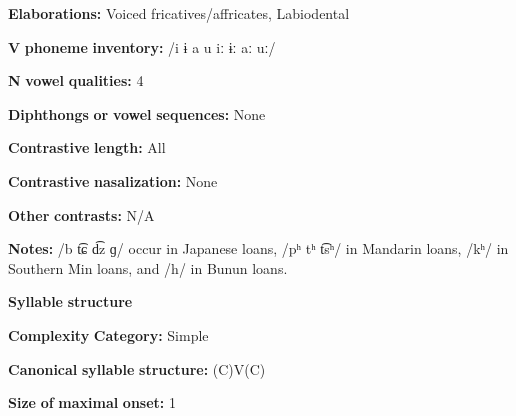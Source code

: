 \begin{styleBody}
\textbf{Elaborations:} Voiced fricatives/affricates, Labiodental
\end{styleBody}

\begin{styleBody}
\textbf{V} \textbf{phoneme} \textbf{inventory:} /i ɨ a u iː ɨː aː uː/
\end{styleBody}

\begin{styleBody}
\textbf{N} \textbf{vowel} \textbf{qualities:} 4
\end{styleBody}

\begin{styleBody}
\textbf{Diphthongs} \textbf{or} \textbf{vowel} \textbf{sequences:} None
\end{styleBody}

\begin{styleBody}
\textbf{Contrastive} \textbf{length:} All
\end{styleBody}

\begin{styleBody}
\textbf{Contrastive} \textbf{nasalization:} None
\end{styleBody}

\begin{styleBody}
\textbf{Other} \textbf{contrasts:} N/A
\end{styleBody}

\begin{styleBody}
\textbf{Notes:} /b t͡ɕ d͡z ɡ/ occur in Japanese loans, /pʰ tʰ t͡sʰ/ in Mandarin loans, /kʰ/ in Southern Min loans, and /h/ in Bunun loans.
\end{styleBody}

\begin{styleBody}
\textbf{Syllable} \textbf{structure}
\end{styleBody}

\begin{styleBody}
\textbf{Complexity} \textbf{Category:} Simple
\end{styleBody}

\begin{styleBody}
\textbf{Canonical} \textbf{syllable} \textbf{structure:} (C)V(C) \citep[32-33]{Pan2012}
\end{styleBody}

\begin{styleBody}
\textbf{Size} \textbf{of} \textbf{maximal} \textbf{onset:} 1
\end{styleBody}


